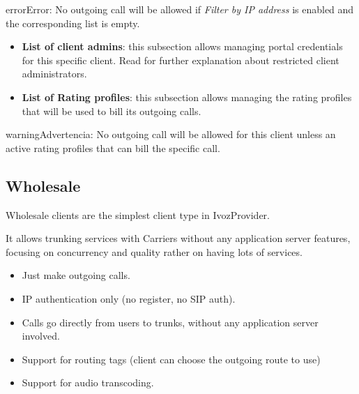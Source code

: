 \documentclass[letterpaper,10pt,spanish]{sphinxmanual}
\begin{document}
\begin{notice}{error}{Error:}
No outgoing call will be allowed if \emph{Filter by IP address} is enabled and the corresponding list is empty.
\end{notice}
\begin{itemize}
\item {} 
\textbf{List of client admins}: this subsection allows managing portal credentials for this specific client. Read {\hyperref[api_rest/acls:acls]{}}
for further explanation about restricted client administrators.

\item {} 
\textbf{List of Rating profiles}: this subsection allows managing the rating profiles that will be used to bill its outgoing calls.

\end{itemize}

\begin{notice}{warning}{Advertencia:}
No outgoing call will be allowed for this client unless an active rating profiles that can
bill the specific call.
\end{notice}


\subsection{Wholesale}
\label{administration_portal/brand/clients/wholesale:wholesale}\label{administration_portal/brand/clients/wholesale:wholesale-clients}\label{administration_portal/brand/clients/wholesale::doc}
Wholesale clients are the simplest client type in IvozProvider.

It allows trunking services with Carriers without any application server features,
focusing on concurrency and quality rather on having lots of services.
\begin{itemize}
\item {} 
Just make outgoing calls.

\item {} 
IP authentication only (no register, no SIP auth).

\item {} 
Calls go directly from users to trunks, without any application server involved.

\item {} 
Support for routing tags (client can choose the outgoing route to use)

\item {} 
Support for audio transcoding.

\end{itemize}
\end{document}
